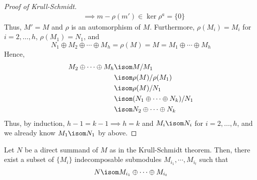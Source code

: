 \documentclass[11pt,leqno,oneside]{amsbook}
\numberwithin{thm}{section}
\begin{document}
\begin{proof}[Proof of Krull-Schmidt]
\begin{align*}
    & \implies m-\rho(m') \in \ker \rho^a = \{0\}
  \end{align*}
  Thus, \(M' = M\) and \(\rho\) is an automorphism of
  \(M\). Furthermore, \(\rho(M_i) = M_i\) for \(i = 2,\ldots,h\),
  \(\rho(M_1) = N_1\), and \[
    N_1 \oplus M_2 \oplus \cdots \oplus M_h = \rho(M) = M = M_1 \oplus
    \cdots \oplus M_h
  \]
  Hence,
  \begin{align*}
    M_2 \oplus \cdots \oplus M_h
    & \isom M/M_1 \\
    & \isom \rho(M)/\rho(M_1) \\
    & \isom \rho(M)/N_1 \\
    & \isom (N_1 \oplus \cdots \oplus N_k) / N_1 \\
    & \isom N_2 \oplus \cdots \oplus N_k
  \end{align*}
  Thus, by induction, \(h-1 = k-1 \implies h = k\) and \(M_i \isom
  N_i\) for \(i=2,\ldots,h\), and we already know \(M_1 \isom N_1\) by
  above.
\end{proof}
\begin{cor}
  Let \(N\) be a direct summand of \(M\) as in the Krull-Schmidt
  theorem. Then, there exist a subset of \(\{M_i\}\) indecomposable submodules 
  \(M_{i_1}, \cdots , M_{i_t}\) such that \[
    N \isom M_{i_1} \oplus \cdots \oplus M_{i_t}
  \]
\end{cor}
\end{document}
